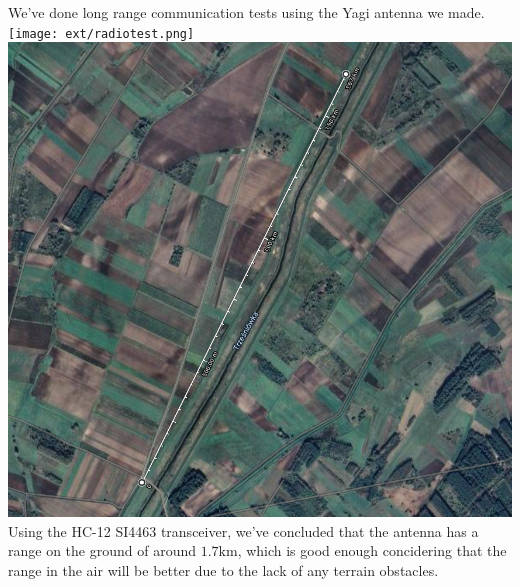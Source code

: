 \documentclass[class=report, crop=false]{standalone}
\begin{document}
We've done long range communication tests using the Yagi antenna we made. \\
\texttt{[image: ext/radiotest.png]}
\includegraphics[width=\columnwidth]{ext/radiomap.png}
Using the HC-12 SI4463 transceiver, we've concluded that the antenna has a range on the ground of around $1.7\text{km}$, which is good enough concidering that the range in the air will be better due to the lack of any terrain obstacles. 
\end{document}
